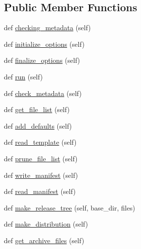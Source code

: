 \subsection*{Public Member Functions}
\begin{DoxyCompactItemize}
\item 
def \hyperlink{classsetuptools_1_1__distutils_1_1command_1_1sdist_1_1sdist_a5d4fd7cfb6001724ed1c00e5b45c5fb6}{checking\+\_\+metadata} (self)
\item 
def \hyperlink{classsetuptools_1_1__distutils_1_1command_1_1sdist_1_1sdist_a65043f9e5110b6d2eec5ec5944c7d9ae}{initialize\+\_\+options} (self)
\item 
def \hyperlink{classsetuptools_1_1__distutils_1_1command_1_1sdist_1_1sdist_ac60d10be1979f37270ca50146d5f1364}{finalize\+\_\+options} (self)
\item 
def \hyperlink{classsetuptools_1_1__distutils_1_1command_1_1sdist_1_1sdist_a0db02603538670a4ed6271db54919353}{run} (self)
\item 
def \hyperlink{classsetuptools_1_1__distutils_1_1command_1_1sdist_1_1sdist_a7389217eb6f4551f1d27bdc94811ae11}{check\+\_\+metadata} (self)
\item 
def \hyperlink{classsetuptools_1_1__distutils_1_1command_1_1sdist_1_1sdist_a57eefc3493a7e6ae4453522579b07406}{get\+\_\+file\+\_\+list} (self)
\item 
def \hyperlink{classsetuptools_1_1__distutils_1_1command_1_1sdist_1_1sdist_a7e3e9e750e6e5f079000c3443afe18b1}{add\+\_\+defaults} (self)
\item 
def \hyperlink{classsetuptools_1_1__distutils_1_1command_1_1sdist_1_1sdist_a9c5e2b9c5a346a86c631627a7880826f}{read\+\_\+template} (self)
\item 
def \hyperlink{classsetuptools_1_1__distutils_1_1command_1_1sdist_1_1sdist_aaf5f67563ff6c6b220f67220420d8078}{prune\+\_\+file\+\_\+list} (self)
\item 
def \hyperlink{classsetuptools_1_1__distutils_1_1command_1_1sdist_1_1sdist_a70596d45359ff9b18a4895628b9b5629}{write\+\_\+manifest} (self)
\item 
def \hyperlink{classsetuptools_1_1__distutils_1_1command_1_1sdist_1_1sdist_acf519846fd90bf80dc9503ed76c3b2b1}{read\+\_\+manifest} (self)
\item 
def \hyperlink{classsetuptools_1_1__distutils_1_1command_1_1sdist_1_1sdist_a124114db5167df9b9530789bc8d6386e}{make\+\_\+release\+\_\+tree} (self, base\+\_\+dir, files)
\item 
def \hyperlink{classsetuptools_1_1__distutils_1_1command_1_1sdist_1_1sdist_ab640b8df57981d192ceeee9100e34c86}{make\+\_\+distribution} (self)
\item 
def \hyperlink{classsetuptools_1_1__distutils_1_1command_1_1sdist_1_1sdist_a71f092e5055fd0b8ae53f920fcbc4271}{get\+\_\+archive\+\_\+files} (self)
\end{DoxyCompactItemize}
